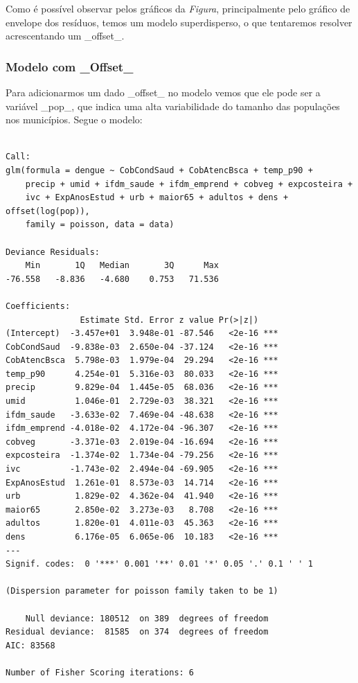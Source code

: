 \documentclass[12pt,a4paper]{article}\usepackage[]{graphicx}\usepackage[]{color}
\makeatletter
\newenvironment{kframe}{%
 \def\at@end@of@kframe{}%
 \ifinner\ifhmode%
  \def\at@end@of@kframe{\end{minipage}}%
  \begin{minipage}{\columnwidth}%
 \fi\fi%
 \def\FrameCommand##1{\hskip\@totalleftmargin \hskip-\fboxsep
 \colorbox{shadecolor}{##1}\hskip-\fboxsep
     \hskip-\linewidth \hskip-\@totalleftmargin \hskip\columnwidth}%
 \MakeFramed {\advance\hsize-\width
   \@totalleftmargin\z@ \linewidth\hsize
   \@setminipage}}%
 {\par\unskip\endMakeFramed%
 \at@end@of@kframe}
\newenvironment{knitrout}{}{} %
\makeatother
\begin{document}
Como é possível observar pelos gráficos da \emph{Figura}, principalmente pelo gráfico de envelope dos resíduos, temos um modelo superdisperso, o que tentaremos resolver acrescentando um \_offset\_.

\subsubsection{\textbf{Modelo com \_Offset\_}}

Para adicionarmos um dado \_offset\_ no modelo vemos que ele pode ser a variável \_pop\_, que indica uma alta variabilidade do tamanho das populações nos municípios. Segue o modelo:

\begin{knitrout}
\color{fgcolor}\begin{kframe}
\begin{verbatim}

Call:
glm(formula = dengue ~ CobCondSaud + CobAtencBsca + temp_p90 + 
    precip + umid + ifdm_saude + ifdm_emprend + cobveg + expcosteira + 
    ivc + ExpAnosEstud + urb + maior65 + adultos + dens + offset(log(pop)), 
    family = poisson, data = data)

Deviance Residuals: 
    Min       1Q   Median       3Q      Max  
-76.558   -8.836   -4.680    0.753   71.536  

Coefficients:
               Estimate Std. Error z value Pr(>|z|)    
(Intercept)  -3.457e+01  3.948e-01 -87.546   <2e-16 ***
CobCondSaud  -9.838e-03  2.650e-04 -37.124   <2e-16 ***
CobAtencBsca  5.798e-03  1.979e-04  29.294   <2e-16 ***
temp_p90      4.254e-01  5.316e-03  80.033   <2e-16 ***
precip        9.829e-04  1.445e-05  68.036   <2e-16 ***
umid          1.046e-01  2.729e-03  38.321   <2e-16 ***
ifdm_saude   -3.633e-02  7.469e-04 -48.638   <2e-16 ***
ifdm_emprend -4.018e-02  4.172e-04 -96.307   <2e-16 ***
cobveg       -3.371e-03  2.019e-04 -16.694   <2e-16 ***
expcosteira  -1.374e-02  1.734e-04 -79.256   <2e-16 ***
ivc          -1.743e-02  2.494e-04 -69.905   <2e-16 ***
ExpAnosEstud  1.261e-01  8.573e-03  14.714   <2e-16 ***
urb           1.829e-02  4.362e-04  41.940   <2e-16 ***
maior65       2.850e-02  3.273e-03   8.708   <2e-16 ***
adultos       1.820e-01  4.011e-03  45.363   <2e-16 ***
dens          6.176e-05  6.065e-06  10.183   <2e-16 ***
---
Signif. codes:  0 '***' 0.001 '**' 0.01 '*' 0.05 '.' 0.1 ' ' 1

(Dispersion parameter for poisson family taken to be 1)

    Null deviance: 180512  on 389  degrees of freedom
Residual deviance:  81585  on 374  degrees of freedom
AIC: 83568

Number of Fisher Scoring iterations: 6
\end{verbatim}
\end{kframe}
\end{knitrout}
\end{document}
